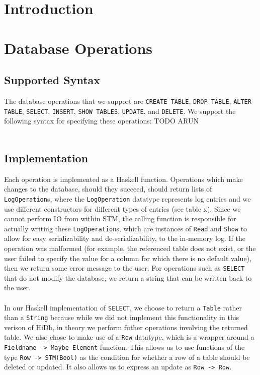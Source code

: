 \documentclass[10pt]{article}
\begin{document}
\vspace{5mm}
\begin{multicols}{2}

\section{Introduction} 

\section{Database Operations}
\subsection{Supported Syntax}
\label{simplifying_parsing_assumptions}
The database operations that we support are \texttt{CREATE TABLE}, \texttt{DROP TABLE}, \texttt{ALTER TABLE}, \texttt{SELECT}, \texttt{INSERT}, \texttt{SHOW TABLES}, \texttt{UPDATE}, and \texttt{DELETE}.  We support the following syntax for specifying these operations:
TODO ARUN \\\\
\subsection{Implementation}
Each operation is implemented as a Haskell function.  Operations which make changes to the database, should they succeed, should return lists of \texttt{LogOperation}s, where the \texttt{LogOperation} datatype represents log entries and we use different constructors for different types of entries (see table x). Since we cannot perform IO from within STM, the calling function is responsible for actually writing these \texttt{LogOperation}s, which are instances of \texttt{Read} and \texttt{Show} to allow for easy serializability and de-serializability, to the in-memory log. If the operation was malformed (for example, the referenced table does not exist, or the user failed to specify the value for a column for which there is no default value), then we return some error message to the user. For operations such as \texttt{SELECT} that do not modify the database, we return a string that can be written back to the user. \\\\
In our Haskell implementation of \texttt{SELECT}, we choose to return a \texttt{Table} rather than a \texttt{String} because while we did not implement this functionality in this verison of HiDb, in theory we perform futher operations involving the returned table. We also chose to make use of a \texttt{Row} datatype, which is a wrapper around a \texttt{Fieldname -> Maybe Element} function. This allows us to use functions of the type \texttt{Row -> STM(Bool)} as the condition for whether a row of a table should be deleted or updated. It also allows us to express an update as \texttt{Row -> Row}. 


\end{multicols}
\end{document}
